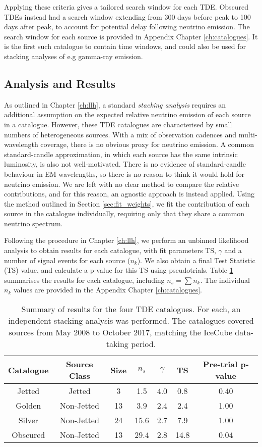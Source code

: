 Applying these criteria gives a tailored search window for each TDE. Obscured TDEs instead had a search window extending from 300 days before peak to 100 days after peak, to account for potential delay following neutrino emission. The search window for each source is provided in Appendix Chapter \ref{ch:catalogues}. It is the first such catalogue to contain time windows, and could also be used for stacking analyses of e.g gamma-ray emission.

\subsection{Analysis and Results}

As outlined in Chapter \ref{ch:llh}, a standard \emph{stacking analysis} requires an additional assumption on the expected relative neutrino emission of each source in a catalogue. However, these TDE catalogues are characterised by small numbers of heterogeneous sources. With a mix of observation cadences and multi-wavelength coverage, there is no obvious proxy for neutrino emission. A common standard-candle approximation, in which each source has the same intrinsic luminosity, is also not well-motivated. There is no evidence of standard-candle behaviour in EM wavelengths, so there is no reason to think it would hold for neutrino emission. We are left with no clear method to compare the relative contributions, and for this reason, an agnostic approach is instead applied. Using the method outlined in Section \ref{sec:fit_weights}, we fit the contribution of each source in the catalogue individually, requiring only that they share a common neutrino spectrum.

Following the procedure in Chapter \ref{ch:llh}, we perform an unbinned likelihood analysis to obtain results for each catalogue, with fit parameters TS, $\gamma$ and a number of signal events for each source ($n_{k}$). We also obtain a final Test Statistic (TS) value, and calculate a p-value for this TS using pseudotrials. Table \ref{tab:stacking_tests} summarises the results for each catalogue, including $n_{s} = \sum n_{k}$. The individual $n_{k}$ values are provided in the Appendix Chapter \ref{ch:catalogues}.

\begin{table}[]
	\centering
	\begin{tabular}{||c c c| c c c | c||} 
		\hline
		Catalogue & Source Class & Size & $n_{s}$  & $\gamma$ & TS & Pre-trial p-value\\
		\hline\hline
		Jetted & Jetted &  3 & 1.5& 4.0&0.8&0.40\\ 
		\hline
		Golden & Non-Jetted & 13 &3.9&2.4& 2.4&1.00\\
		\hline
		Silver & Non-Jetted & 24 &15.6&2.7&7.9 & 1.00\\
		\hline
		Obscured & Non-Jetted & 13 &29.4&2.8&14.8& 0.04\\[1ex] 
		\hline
	\end{tabular}
	\caption{Summary of results for the four TDE catalogues. For each, an independent stacking analysis was performed. The catalogues covered sources from May 2008 to October 2017, matching the IceCube data-taking period.}
	\label{tab:stacking_tests}
\end{table}{}

